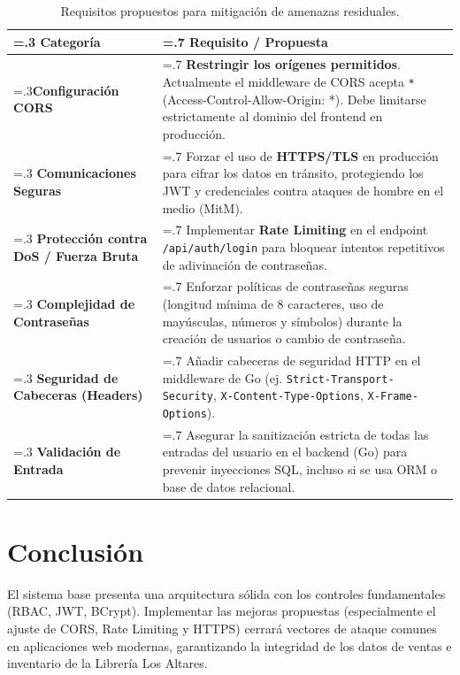 \documentclass[12pt,a4paper]{article}
\begin{document}
\begin{table}[h!]
\centering
\begin{tabularx}{\textwidth}{|>{\hsize=.3\hsize}X|>{\hsize=.7\hsize}X|}
\hline
\rowcolor{gray!20} \textbf{Categoría} & \textbf{Requisito / Propuesta} \\ \hline
\textbf{Configuración CORS} & \textbf{Restringir los orígenes permitidos}. Actualmente el middleware de CORS acepta \texttt{*} (Access-Control-Allow-Origin: *). Debe limitarse estrictamente al dominio del frontend en producción. \\ \hline
\textbf{Comunicaciones Seguras} & Forzar el uso de \textbf{HTTPS/TLS} en producción para cifrar los datos en tránsito, protegiendo los JWT y credenciales contra ataques de hombre en el medio (MitM). \\ \hline
\textbf{Protección contra DoS / Fuerza Bruta} & Implementar \textbf{Rate Limiting} en el endpoint \texttt{/api/auth/login} para bloquear intentos repetitivos de adivinación de contraseñas. \\ \hline
\textbf{Complejidad de Contraseñas} & Enforzar políticas de contraseñas seguras (longitud mínima de 8 caracteres, uso de mayúsculas, números y símbolos) durante la creación de usuarios o cambio de contraseña. \\ \hline
\textbf{Seguridad de Cabeceras (Headers)} & Añadir cabeceras de seguridad HTTP en el middleware de Go (ej. \texttt{Strict-Transport-Security}, \texttt{X-Content-Type-Options}, \texttt{X-Frame-Options}). \\ \hline
\textbf{Validación de Entrada} & Asegurar la sanitización estricta de todas las entradas del usuario en el backend (Go) para prevenir inyecciones SQL, incluso si se usa ORM o base de datos relacional. \\ \hline
\end{tabularx}
\caption{Requisitos propuestos para mitigación de amenazas residuales.}
\end{table}

\section{Conclusión}
El sistema base presenta una arquitectura sólida con los controles fundamentales (RBAC, JWT, BCrypt). Implementar las mejoras propuestas (especialmente el ajuste de CORS, Rate Limiting y HTTPS) cerrará vectores de ataque comunes en aplicaciones web modernas, garantizando la integridad de los datos de ventas e inventario de la Librería Los Altares.
\end{document}
